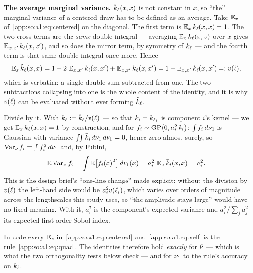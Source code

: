 \textbf{The average marginal variance.} $\tilde k_\ell(x,x)$ is not constant in $x$,
so ``the'' marginal variance of a centered draw has to be defined as an
average. Take $\Ex{x}$ of~\eqref{app:so:a1:eq:centered} on the diagonal. The
first term is $\Ex{x}\kl(x,x)=1$. The two cross terms are the \emph{same}
double integral --- averaging $\Ex{z}\kl(x,z)$ over $x$ gives
$\Ex{x,x'}\kl(x,x')$, and so does the mirror term, by symmetry of $k_\ell$ ---
and the fourth term is that same double integral once more. Hence
\begin{equation}\label{app:so:a1:eq:vell}
  \Ex{x}\ktil(x,x)
  =1-2\,\Ex{x,x'}\kl(x,x')+\Ex{x,x'}\kl(x,x')
  =1-\Ex{x,x'}\kl(x,x')
  =:\vell{\ell},
\end{equation}
which is  verbatim: a single double sum subtracted from one.
The two subtractions collapsing into one is the whole content of the identity,
and it is why $v(\ell)$ can be evaluated without ever forming $\tilde k_\ell$.

Divide by it. With $\bar k_\ell:=\tilde k_\ell/v(\ell)$ --- so that
$\bar k_i=\bar k_{\ell_i}$
is component $i$'s kernel --- we get $\Ex{x}\bar k_\ell(x,x)=1$ by
construction, and for $f_i\sim\mathrm{GP}\bigl(0,a_i^2\,\bar k_i\bigr)$: $\int
f_i\,d\nu_1$ is Gaussian with variance
$\iint\bar k_i\,d\nu_1\,d\nu_1=0$, hence zero almost surely, so $\operatorname{\mathrm{Var}}_\nu
f_i=\int f_i^2\,d\nu_1$ and, by Fubini,
\begin{equation}\label{app:so:a1:eq:unitvar}
  \Ex{}\Varnu f_i
  =\int\Ex{}\bigl[{f_i(x)}^2\bigr]\,d\refnu_1(x)
  =a_i^2\,\Ex{x}\kbar(x,x)
  =a_i^2 .
\end{equation}
This is the design brief's ``one-line change'' made explicit: without the
division by $v(\ell)$ the left-hand side would be $a_i^2v(\ell_i)$,
which varies over orders of magnitude across the lengthscales this study uses,
so ``the amplitude stays large'' would have no fixed meaning. With it, $a_i^2$
is the component's expected variance and $a_i^2/\sum_j a_j^2$ its expected
first-order Sobol index.

In code every $\Ex{z}$ in~\eqref{app:so:a1:eq:centered}
and~\eqref{app:so:a1:eq:vell} is the rule~\eqref{app:so:a1:eq:quad}. The
identities therefore hold \emph{exactly} for $\hat\nu$ --- which is what the
two orthogonality tests below check --- and for $\nu_1$ to the rule's
accuracy on $k_\ell$.

